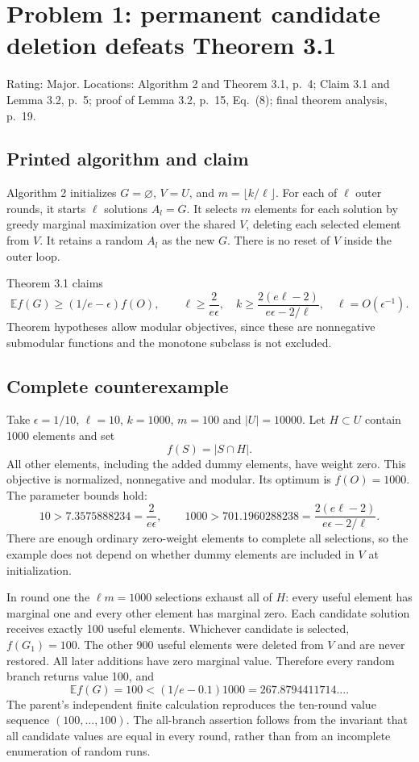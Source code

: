 \documentclass[10pt]{article}
\begin{document}
\section*{Problem 1: permanent candidate deletion defeats Theorem 3.1}
Rating: Major. Locations: Algorithm 2 and Theorem 3.1, p. 4; Claim 3.1 and Lemma 3.2, p. 5; proof of Lemma 3.2, p. 15, Eq. (8); final theorem analysis, p. 19.\par
\subsection*{Printed algorithm and claim}
Algorithm 2 initializes \(G=\varnothing\), \(V=U\), and \(m=\lfloor k/\ell\rfloor\). For each of \(\ell\) outer rounds, it starts \(\ell\) solutions \(A_l=G\). It selects \(m\) elements for each solution by greedy marginal maximization over the shared \(V\), deleting each selected element from \(V\). It retains a random \(A_l\) as the new \(G\). There is no reset of \(V\) inside the outer loop.\par
Theorem 3.1 claims \[\mathbb E f(G)\ge(1/e-\epsilon)f(O),
 \qquad
 \ell\ge\frac{2}{e\epsilon},\quad
 k\ge\frac{2(e\ell-2)}{e\epsilon-2/\ell},
 \quad \ell=O(\epsilon^{-1}).\] Theorem hypotheses allow modular objectives, since these are nonnegative submodular functions and the monotone subclass is not excluded.\par
\subsection*{Complete counterexample}
Take \(\epsilon=1/10\), \(\ell=10\), \(k=1000\), \(m=100\) and \(|U|=10000\). Let \(H\subset U\) contain 1000 elements and set \[f(S)=|S\cap H|.\] All other elements, including the added dummy elements, have weight zero. This objective is normalized, nonnegative and modular. Its optimum is \(f(O)=1000\). The parameter bounds hold: \[10>7.3575888234=\frac{2}{e\epsilon},\qquad
 1000>701.1960288238=\frac{2(e\ell-2)}{e\epsilon-2/\ell}.\] There are enough ordinary zero-weight elements to complete all selections, so the example does not depend on whether dummy elements are included in \(V\) at initialization.\par
In round one the \(\ell m=1000\) selections exhaust all of \(H\): every useful element has marginal one and every other element has marginal zero. Each candidate solution receives exactly 100 useful elements. Whichever candidate is selected, \(f(G_1)=100\). The other 900 useful elements were deleted from \(V\) and are never restored. All later additions have zero marginal value. Therefore every random branch returns value 100, and \[\mathbb E f(G)=100<(1/e-0.1)1000=267.8794411714\ldots.\] The parent’s independent finite calculation reproduces the ten-round value sequence \((100,\ldots,100)\). The all-branch assertion follows from the invariant that all candidate values are equal in every round, rather than from an incomplete enumeration of random runs.\par
\end{document}

